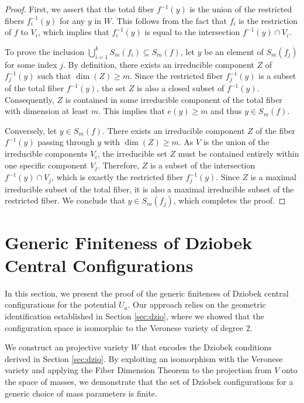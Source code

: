 \documentclass{amsart}
\theoremstyle{definition}
\theoremstyle{remark}
\numberwithin{equation}{section}
\begin{document}
\begin{proof}
First, we assert that the total fiber $f^{-1}(y)$ is the union of the restricted fibers $f_i^{-1}(y)$ for any $y$ in $W$. This follows from the fact that $f_i$ is the restriction of $f$ to $V_i$, which implies that $f_i^{-1}(y)$ is equal to the intersection $f^{-1}(y) \cap V_i$.

To prove the inclusion $\bigcup_{i=1}^k S_m(f_i) \subseteq S_m(f)$, let $y$ be an element of $S_m(f_j)$ for some index $j$. By definition, there exists an irreducible component $Z$ of $f_j^{-1}(y)$ such that $\dim(Z) \ge m$. Since the restricted fiber $f_j^{-1}(y)$ is a subset of the total fiber $f^{-1}(y)$, the set $Z$ is also a closed subset of $f^{-1}(y)$. Consequently, $Z$ is contained in some irreducible component of the total fiber with dimension at least $m$. This implies that $e(y) \ge m$ and thus $y \in S_m(f)$.

Conversely, let $y \in S_m(f)$. There exists an irreducible component $Z$ of the fiber $f^{-1}(y)$ passing through $y$ with $\dim(Z) \ge m$. As $V$ is the union of the irreducible components $V_i$, the irreducible set $Z$ must be contained entirely within one specific component $V_j$. Therefore, $Z$ is a subset of the intersection $f^{-1}(y) \cap V_j$, which is exactly the restricted fiber $f_j^{-1}(y)$. Since $Z$ is a maximal irreducible subset of the total fiber, it is also a maximal irreducible subset of the restricted fiber. We conclude that $y \in S_m(f_j)$, which completes the proof.
\end{proof}


\section{Generic Finiteness of Dziobek Central Configurations}\label{sec:fin}

In this section, we present the proof of the generic finiteness of Dziobek central configurations for the potential $U_a$. Our approach relies on the geometric identification established in Section \ref{sec:dzio}, where we showed that the configuration space is isomorphic to the Veronese variety of degree 2.

We construct an projective variety $W$  that encodes the Dziobek conditions derived in Section \ref{sec:dzio}. By exploiting an isomorphism with the Veronese variety and applying the Fiber Dimension Theorem to the projection from $V$ onto the space of masses, we demonstrate that the set of Dziobek configurations for a generic choice of mass parameters is finite.
\end{document}

